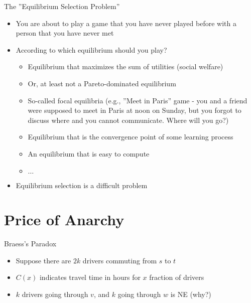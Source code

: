 \documentclass[11pt,aspectratio=169,handout]{beamer}
\begin{document}
  \begin{frame}{The ''Equilibrium Selection Problem''}
  \begin{itemize}[<+->]
   \item You are about to play a game that you have never played before with a person that you have never met
   \item According to which equilibrium should you play?
   \begin{itemize}
    \item Equilibrium that maximizes the sum of utilities (\alert{social welfare})
    \item Or, at least not a \alert{Pareto-dominated} equilibrium
    \item So-called focal equilibria (e.g., ''Meet in Paris'' game - you and a friend were supposed to meet in Paris at noon on Sunday, but you forgot to discuss where and you cannot communicate. Where will you go?)
    \item Equilibrium that is the convergence point of some learning process
    \item An equilibrium that is easy to compute
    \item $\dots$
   \end{itemize}
   \item Equilibrium selection is a difficult problem
  \end{itemize}
  \end{frame}
  
 \section{Price of Anarchy}

  \begin{frame}{Braess's Paradox}
   \begin{center}
   \end{center}
   \begin{itemize}[<+->]
    \item Suppose there are $2k$ drivers commuting from $s$ to $t$
    \item $C(x)$ indicates travel time in hours for $x$ fraction of drivers 
    \item $k$ drivers going through $v$, and $k$ going through $w$ is NE (why?)
   \end{itemize}
  \end{frame}
  
\end{document}
